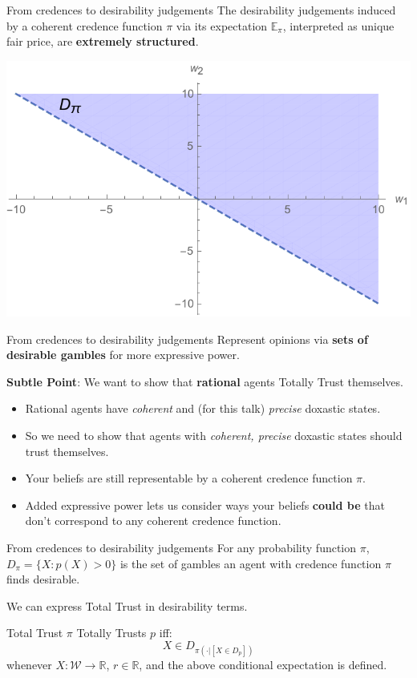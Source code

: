 \documentclass[aspectratio=169, dvipsnames]{beamer}
\newcommand{\R}{\mathbb{R}}
\newcommand{\E}{\mathbb{E}}
\newcommand{\W}{\mathcal{W}}
\begin{document}
\begin{frame}{From credences to desirability judgements}
  The desirability judgements induced by a coherent credence function $\pi$ via its expectation $\E_{\pi}$, interpreted as unique
  fair price, are \textbf{extremely structured}.
  \begin{center}
      \includegraphics[width=.7\textwidth]{desirability1.pdf}
  \end{center}
\end{frame}

\begin{frame}{From credences to desirability judgements}
  Represent opinions via \alert{\textbf{sets of desirable gambles}} for more expressive power.

  \textbf{Subtle Point}: We want to show that \alert{\textbf{rational}} agents Totally Trust themselves.
  \begin{itemize}
    \item Rational agents have \textit{coherent} and (for this talk) \textit{precise} doxastic states.
    \item So we need to show that agents with \textit{coherent, precise} doxastic states should trust themselves. 
    \item Your beliefs are still representable by a coherent credence function $\pi$.
    \item Added expressive power lets us consider ways your beliefs \textbf{\alert{could be}}
      that don't correspond to any coherent credence function.
  \end{itemize}
\end{frame}

\begin{frame}{From credences to desirability judgements}
  For any probability function $\pi$, $D_{\pi} = \{X : p(X) > 0\}$ is the set of gambles an agent with credence function
  $\pi$ finds desirable.
  
  We can express Total Trust in desirability terms.
  \begin{block}{Total Trust}
    $\pi$ Totally Trusts $p$ iff:
    \begin{equation}
      \label{totTrust}
      X \in D_{\pi(\cdot| [X \in D_p])}
    \end{equation}
    whenever $X: \W \to \R$, $r \in \R$, and the above conditional expectation is defined.
  \end{block}
\end{frame}
\end{document}
